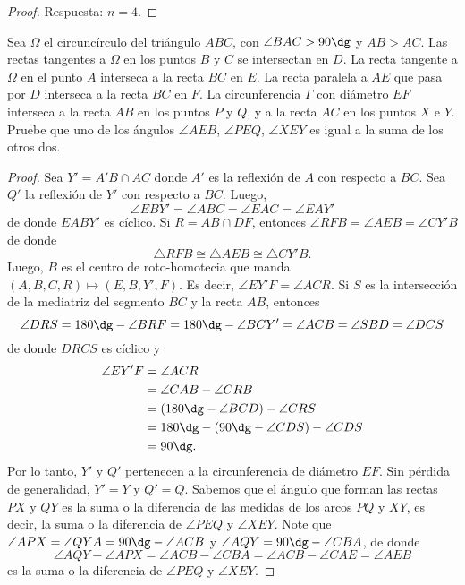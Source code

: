 \begin{proof}
	Respuesta: $n=4$.
\end{proof}

\begin{probMB}
	Sea $\Omega$ el circuncírculo del triángulo $ABC$, con $\angle BAC>90\dg$ y $AB>AC$. Las rectas tangentes a $\Omega$ en los puntos $B$ y $C$ se intersectan en $D$. La recta tangente a $\Omega$ en el punto $A$ interseca a la recta $BC$ en $E$. La recta paralela a $AE$ que pasa por $D$ interseca a la recta $BC$ en $F$. La circunferencia $\Gamma$ con diámetro $EF$ interseca a la recta $AB$ en los puntos $P$ y $Q$, y a la recta $AC$ en los puntos $X$ e $Y$. Pruebe que uno de los ángulos $\angle AEB$, $\angle PEQ$, $\angle XEY$ es igual a la suma de los otros dos.
\end{probMB}

\begin{proof}
	Sea $Y'=A'B\cap AC$ donde $A'$ es la reflexión de $A$ con respecto a $BC$. Sea $Q'$ la reflexión de $Y'$ con respecto a $BC$. Luego,
	\[\angle EBY'=\angle ABC=\angle EAC=\angle EAY'\]
	de donde $EABY'$ es cíclico. Si $R=AB\cap DF$, entonces $\angle RFB=\angle AEB=\angle CY'B$ de donde
	\[\triangle RFB\cong\triangle AEB\cong\triangle CY'B.\]
	Luego, $B$ es el centro de roto-homotecia que manda $(A,B,C,R)\mapsto(E,B,Y',F)$. Es decir, $\angle EY'F=\angle ACR$. Si $S$ es la intersección de la mediatriz del segmento $BC$ y la recta $AB$, entonces
	\[\angle DRS=180\dg-\angle BRF=180\dg-\angle BCY'=\angle ACB=\angle SBD=\angle DCS\]
	de donde $DRCS$ es cíclico y
	\begin{align*}
		\angle EY'F
		&=\angle ACR\\
		&=\angle CAB-\angle CRB\\
		&=(180\dg-\angle BCD)-\angle CRS\\
		&=180\dg-(90\dg-\angle CDS)-\angle CDS\\
		&=90\dg.
	\end{align*}
	Por lo tanto, $Y'$ y $Q'$ pertenecen a la circunferencia de diámetro $EF$. Sin pérdida de generalidad, $Y'=Y$ y $Q'=Q$. Sabemos que el ángulo que forman las rectas $PX$ y $QY$ es la suma o la diferencia de las medidas de los arcos $PQ$ y $XY$, es decir, la suma o la diferencia de $\angle PEQ$ y $\angle XEY$. Note que $\angle APX=\angle QYA=90\dg-\angle ACB$ y $\angle AQY=90\dg-\angle CBA$, de donde
	\[\angle AQY-\angle APX=\angle ACB-\angle CBA=\angle ACB-\angle CAE=\angle AEB\]
	es la suma o la diferencia de $\angle PEQ$ y $\angle XEY$.
\end{proof}

